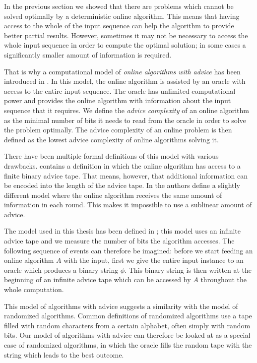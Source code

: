In the previous section we showed that there are problems which cannot be
solved optimally by a deterministic online algorithm. This means that
having access to the whole of the input sequence can help the algorithm to
provide better partial results. However, sometimes it may not be necessary
to access the whole input sequence in order to compute the optimal
solution; in some cases a significantly smaller amount of information is
required.

That is why a computational model of \emph{online algorithms with advice}
has been introduced in \cite{advice-first}. In this model, the online
algorithm is assisted by an oracle with access to the entire input
sequence. The oracle has unlimited computational power and provides the
online algorithm with information about the input sequence that it
requires. We define the \emph{advice complexity} of an online algorithm as
the minimal number of bits it needs to read from the oracle in order to
solve the problem optimally. The advice complexity of an online problem is
then defined as the lowest advice complexity of online algorithms solving
it.

There have been multiple formal definitions of this model with various
drawbacks. \cite{advice-first} contains a definition in which the online
algorithm has access to a finite binary advice tape. That means, however,
that additional information can be encoded into the length of the advice
tape. In \cite{advice-constant} the authors define a slightly different
model where the online algorithm receives the same amount of information
in each round. This makes it impossible to use a sublinear amount of
advice.

The model used in this thesis has been defined in \cite{advice-infinite};
this model uses an infinite advice tape and we measure the number of bits
the algorithm accesses. The following sequence of events can therefore be
imagined: before we start feeding an online algorithm $A$ with the input,
first we give the entire input instance to an oracle which produces a
binary string $\phi$. This binary string is then written at the beginning
of an infinite advice tape which can be accessed by $A$ throughout the
whole computation.

This model of algorithms with advice suggests a similarity with the model
of randomized algorithms. Common definitions of randomized algorithms use
a tape filled with random characters from a certain alphabet, often simply
with random bits. Our model of algorithms with advice can therefore be
looked at as a special case of randomized algorithms, in which the oracle
fills the random tape with the string which leads to the best outcome.

